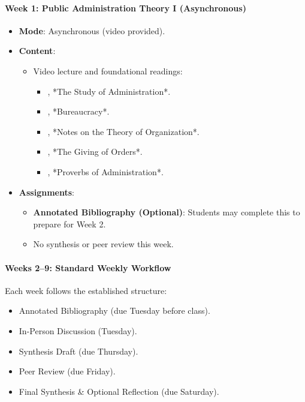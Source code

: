 \documentclass[11pt, letterpaper]{article}
\begin{document}
\paragraph{Week 1: Public Administration Theory I (Asynchronous)}
\begin{itemize}
    \item \textbf{Mode}: Asynchronous (video provided).
    \item \textbf{Content}:
    \begin{itemize}
        \item Video lecture and foundational readings:
        \begin{itemize}
            \item \citet{wilson1887}, *The Study of Administration*.
            \item \citet{Weber1946}, *Bureaucracy*.
            \item \citet{gulick1937}, *Notes on the Theory of Organization*.
            \item \citet{Follett1926}, *The Giving of Orders*.
            \item \citet{simon1946}, *Proverbs of Administration*.
        \end{itemize}
    \end{itemize}
    \item \textbf{Assignments}:
    \begin{itemize}
        \item \textbf{Annotated Bibliography (Optional)}: Students may complete this to prepare for Week 2.
        \item No synthesis or peer review this week.
    \end{itemize}
\end{itemize}

\paragraph{Weeks 2--9: Standard Weekly Workflow}
Each week follows the established structure:
\begin{itemize}
    \item Annotated Bibliography (due Tuesday before class).
    \item In-Person Discussion (Tuesday).
    \item Synthesis Draft (due Thursday).
    \item Peer Review (due Friday).
    \item Final Synthesis \& Optional Reflection (due Saturday).
\end{itemize}
\end{document}
